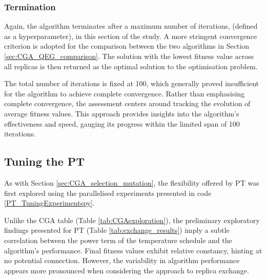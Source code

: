 \documentclass[10pt]{article}
\begin{document}
\begin{multicols}{2}
\subsubsection{Termination}

Again, the algorithm terminates after a maximum number of iterations, (defined as a hyperparameter), in this section of the study. A more stringent convergence criterion is adopted for the comparison between the two algorithms in Section \ref{sec:CGA_QEG_comparison}. The solution with the lowest fitness value across all replicas is then returned as the optimal solution to the optimisation problem.

The total number of iterations is fixed at 100, which generally proved insufficient for the algorithm to achieve complete convergence. Rather than emphasising complete convergence, the assessment centers around tracking the evolution of average fitness values. This approach provides insights into the algorithm's effectiveness and speed, gauging its progress within the limited span of 100 iterations.

\subsection{Tuning the PT}
\label{sec:PTtuning}

As with Section \ref{sec:CGA_selection_mutation}, the flexibility offered by PT was first explored using the parallelised experiments presented in code \ref{PT_TuningExperimentspy}.

Unlike the CGA table (Table \ref{tab:CGAexploration}), the preliminary exploratory findings presented for PT (Table \ref{tab:exchange_results}) imply a subtle correlation between the power term of the temperature schedule and the algorithm's performance. Final fitness values exhibit relative constancy, hinting at no potential connection. However, the variability in algorithm performance appears more pronounced when considering the approach to replica exchange.


\end{multicols}
\end{document}
